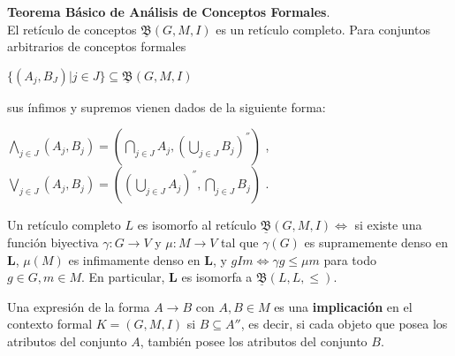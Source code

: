 \documentclass[../../main.tex]{subfiles}
\begin{document}
\begin{teorema}
\textbf{Teorema Básico de Análisis de Conceptos Formales}. \\
El retículo de conceptos $\underline{\mathfrak{B}}(G, M, I)$ es un retículo completo. Para conjuntos arbitrarios de conceptos formales
\begin{center}
    $\{ (A_j, B_J) | j \in J \} \subseteq \underline{\mathfrak{B}}(G, M, I)$ \\
\end{center}
sus ínfimos y supremos vienen dados de la siguiente forma:
\begin{center}

    $\underset{j \in J}{\bigwedge} (A_j, B_j) = (\underset{j \in J}{\bigcap} A_j, (\underset{j \in J}{\bigcup} B_j)^{''}) $ , \\
    $\underset{j \in J}{\bigvee} (A_j, B_j) = ((\underset{j \in J}{\bigcup} A_j)^{''}, \underset{j \in J}{\bigcap} B_j) $ . \\
\end{center}
Un retículo completo $L$ es isomorfo al retículo $\underline{\mathfrak{B}}(G, M, I) \Longleftrightarrow$ si existe una función biyectiva $\gamma : G \rightarrow V$ y $\mu : M \rightarrow V$ tal que $\gamma(G)$ es supramemente denso en $\textbf{L}$, $\mu(M)$ es infimamente denso en $\textbf{L}$, y $gIm \Longleftrightarrow \gamma g \leq \mu m$ para todo $g \in G, m \in M$. En particular, $\textbf{L}$ es isomorfa a $\underline{\mathfrak{B}}(L, L, \leq)$.
\end{teorema}

\begin{definicion}
Una expresión de la forma $A\rightarrow B$ con $A, B\in M$ es una \textbf{implicación} en el contexto formal $K = (G, M, I)$ si $B\subseteq A''$, es decir, si cada objeto que posea los atributos del conjunto $A$, también posee los atributos del conjunto $B$.
\end{definicion}
\end{document}
